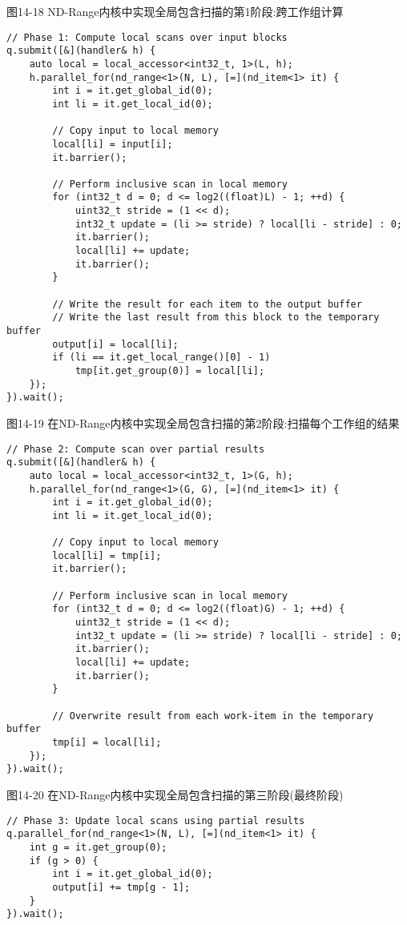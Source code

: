 \hspace*{\fill} \par %
图14-18 ND-Range内核中实现全局包含扫描的第1阶段:跨工作组计算
\begin{lstlisting}[caption={}]
// Phase 1: Compute local scans over input blocks
q.submit([&](handler& h) {
	auto local = local_accessor<int32_t, 1>(L, h);
	h.parallel_for(nd_range<1>(N, L), [=](nd_item<1> it) {
		int i = it.get_global_id(0);
		int li = it.get_local_id(0);
		
		// Copy input to local memory
		local[li] = input[i];
		it.barrier();
		
		// Perform inclusive scan in local memory
		for (int32_t d = 0; d <= log2((float)L) - 1; ++d) {
			uint32_t stride = (1 << d);
			int32_t update = (li >= stride) ? local[li - stride] : 0;
			it.barrier();
			local[li] += update;
			it.barrier();
		}
	
		// Write the result for each item to the output buffer
		// Write the last result from this block to the temporary buffer
		output[i] = local[li];
		if (li == it.get_local_range()[0] - 1)
			tmp[it.get_group(0)] = local[li];
	});
}).wait();
\end{lstlisting}

\hspace*{\fill} \par %
图14-19 在ND-Range内核中实现全局包含扫描的第2阶段:扫描每个工作组的结果
\begin{lstlisting}[caption={}]
// Phase 2: Compute scan over partial results
q.submit([&](handler& h) {
	auto local = local_accessor<int32_t, 1>(G, h);
	h.parallel_for(nd_range<1>(G, G), [=](nd_item<1> it) {
		int i = it.get_global_id(0);
		int li = it.get_local_id(0);
		
		// Copy input to local memory
		local[li] = tmp[i];
		it.barrier();
		
		// Perform inclusive scan in local memory
		for (int32_t d = 0; d <= log2((float)G) - 1; ++d) {
			uint32_t stride = (1 << d);
			int32_t update = (li >= stride) ? local[li - stride] : 0;
			it.barrier();
			local[li] += update;
			it.barrier();
		}
	
		// Overwrite result from each work-item in the temporary buffer
		tmp[i] = local[li];
	});
}).wait();
\end{lstlisting}

\hspace*{\fill} \par %
图14-20 在ND-Range内核中实现全局包含扫描的第三阶段(最终阶段)
\begin{lstlisting}[caption={}]
// Phase 3: Update local scans using partial results
q.parallel_for(nd_range<1>(N, L), [=](nd_item<1> it) {
	int g = it.get_group(0);
	if (g > 0) {
		int i = it.get_global_id(0);
		output[i] += tmp[g - 1];
	}
}).wait();
\end{lstlisting}

